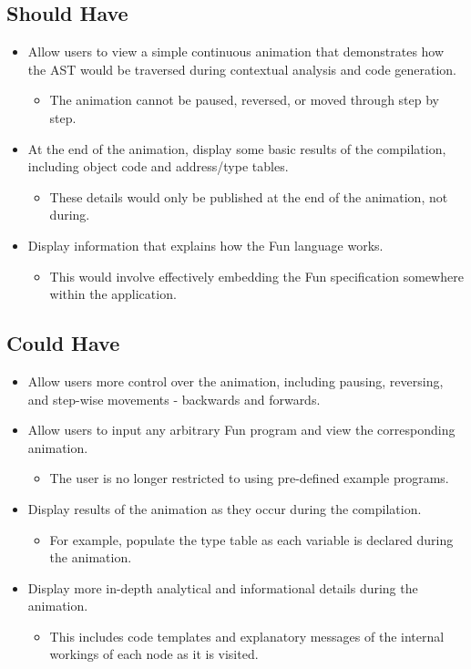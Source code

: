 \documentclass{l4proj}
\begin{document}
\subsection{Should Have}
\begin{itemize}
\item Allow users to view a simple continuous animation that demonstrates how the AST would be traversed during contextual analysis and code generation.
\begin{itemize}
\item The animation cannot be paused, reversed, or moved through step by step.
\end{itemize}
\item At the end of the animation, display some basic results of the compilation, including object code and address/type tables.
\begin{itemize}
\item These details would only be published at the end of the animation, not during.
\end{itemize}
\item Display information that explains how the Fun language works.
\begin{itemize}
\item This would involve effectively embedding the Fun specification somewhere within the application.
\end{itemize}
\end{itemize}
\subsection{Could Have}
\begin{itemize}
\item Allow users more control over the animation, including pausing, reversing, and step-wise movements - backwards and forwards.
\item Allow users to input any arbitrary Fun program and view the corresponding animation.
\begin{itemize}
\item The user is no longer restricted to using pre-defined example programs.
\end{itemize}
\item Display results of the animation as they occur during the compilation.
\begin{itemize}
\item For example, populate the type table as each variable is declared during the animation.
\end{itemize}
\item Display more in-depth analytical and informational details during the animation.
\begin{itemize}
\item This includes code templates and explanatory messages of the internal workings of each node as it is visited.
\end{itemize}
\end{itemize}
\end{document}
